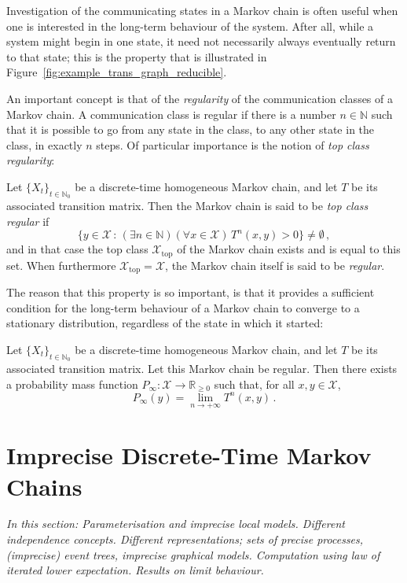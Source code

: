 \documentclass[graybox]{svmult}
\newcommand{\nats}{\mathbb{N}}
\newcommand{\natswith}{\nats_{0}}
\newcommand{\reals}{\mathbb{R}}
\newcommand{\realsnonneg}{\reals_{\geq 0}}
\newcommand{\states}{\mathcal{X}}
\begin{document}
Investigation of the communicating states in a Markov chain is often useful when one is interested in the long-term behaviour of the system. After all, while a system might begin in one state, it need not necessarily always eventually return to that state; this is the property that is illustrated in Figure~\ref{fig:example_trans_graph_reducible}.

An important concept is that of the \emph{regularity} of the communication classes of a Markov chain. A communication class is regular if there is a number $n\in\nats$ such that it is possible to go from any state in the class, to any other state in the class, in exactly $n$ steps. Of particular importance is the notion of \emph{top class regularity}:
\begin{definition}
Let $\{X_t\}_{t\in\natswith}$ be a discrete-time homogeneous Markov chain, and let $T$ be its associated transition matrix. Then the Markov chain is said to be \emph{top class regular} if
\begin{equation*}
\bigl\{ y\in\states\,:\,(\exists n\in\nats)(\forall x\in\states)\, T^n(x,y)>0 \bigr\} \neq \emptyset\,,
\end{equation*}
and in that case the top class $\states_\mathrm{top}$ of the Markov chain exists and is equal to this set. When furthermore $\states_\mathrm{top}=\states$, the Markov chain itself is said to be \emph{regular}.
\end{definition}
The reason that this property is so important, is that it provides a sufficient condition for the long-term behaviour of a Markov chain to converge to a stationary distribution, regardless of the state in which it started:
\begin{theorem}
Let $\{X_t\}_{t\in\natswith}$ be a discrete-time homogeneous Markov chain, and let $T$ be its associated transition matrix. Let this Markov chain be regular. Then there exists a probability mass function $P_\infty:\states\to\realsnonneg$ such that, for all $x,y\in\states$, 
\begin{equation*}
P_\infty(y) = \lim_{n\to+\infty}T^n(x,y)\,.
\end{equation*}
\end{theorem}

\section{Imprecise Discrete-Time Markov Chains}\label{sec:idtmc}

\emph{In this section: Parameterisation and imprecise local models. Different independence concepts. Different representations; sets of precise processes, (imprecise) event trees, imprecise graphical models. Computation using law of iterated lower expectation. Results on limit behaviour.}
\end{document}
